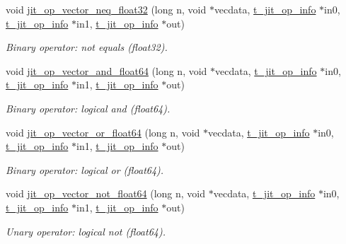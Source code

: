 \begin{DoxyCompactItemize}
void \hyperlink{group__opvecmod_ga26c4d87db1be85cc1823e00c3a7dd14f}{jit\_\-op\_\-vector\_\-neq\_\-float32} (long n, void $\ast$vecdata, \hyperlink{structt__jit__op__info}{t\_\-jit\_\-op\_\-info} $\ast$in0, \hyperlink{structt__jit__op__info}{t\_\-jit\_\-op\_\-info} $\ast$in1, \hyperlink{structt__jit__op__info}{t\_\-jit\_\-op\_\-info} $\ast$out)
\begin{DoxyCompactList}\small\item\em Binary operator: not equals (float32). \item\end{DoxyCompactList}\item 
void \hyperlink{group__opvecmod_ga3f7e9eec50ba1e410fca39b4eb1cbe82}{jit\_\-op\_\-vector\_\-and\_\-float64} (long n, void $\ast$vecdata, \hyperlink{structt__jit__op__info}{t\_\-jit\_\-op\_\-info} $\ast$in0, \hyperlink{structt__jit__op__info}{t\_\-jit\_\-op\_\-info} $\ast$in1, \hyperlink{structt__jit__op__info}{t\_\-jit\_\-op\_\-info} $\ast$out)
\begin{DoxyCompactList}\small\item\em Binary operator: logical and (float64). \item\end{DoxyCompactList}\item 
void \hyperlink{group__opvecmod_ga32839a95ee648910de8a951d1f64f5af}{jit\_\-op\_\-vector\_\-or\_\-float64} (long n, void $\ast$vecdata, \hyperlink{structt__jit__op__info}{t\_\-jit\_\-op\_\-info} $\ast$in0, \hyperlink{structt__jit__op__info}{t\_\-jit\_\-op\_\-info} $\ast$in1, \hyperlink{structt__jit__op__info}{t\_\-jit\_\-op\_\-info} $\ast$out)
\begin{DoxyCompactList}\small\item\em Binary operator: logical or (float64). \item\end{DoxyCompactList}\item 
void \hyperlink{group__opvecmod_ga537bd927f9580bad702b6f41f5681014}{jit\_\-op\_\-vector\_\-not\_\-float64} (long n, void $\ast$vecdata, \hyperlink{structt__jit__op__info}{t\_\-jit\_\-op\_\-info} $\ast$in0, \hyperlink{structt__jit__op__info}{t\_\-jit\_\-op\_\-info} $\ast$in1, \hyperlink{structt__jit__op__info}{t\_\-jit\_\-op\_\-info} $\ast$out)
\begin{DoxyCompactList}\small\item\em Unary operator: logical not (float64). \item\end{DoxyCompactList}\item 

\end{DoxyCompactItemize}
